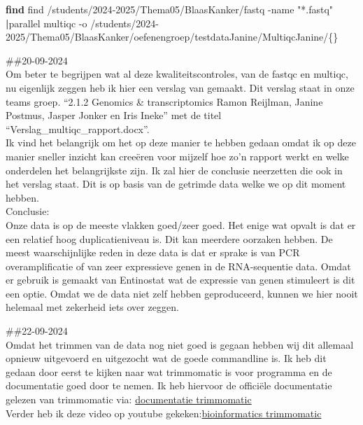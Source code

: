 \documentclass[
]{article}
\newenvironment{Shaded}{\begin{snugshade}}{\end{snugshade}}
\newcommand{\AttributeTok}[1]{\textcolor[rgb]{0.13,0.29,0.53}{#1}}
\newcommand{\ExtensionTok}[1]{#1}
\newcommand{\FunctionTok}[1]{\textcolor[rgb]{0.13,0.29,0.53}{\textbf{#1}}}
\newcommand{\KeywordTok}[1]{\textcolor[rgb]{0.13,0.29,0.53}{\textbf{#1}}}
\newcommand{\NormalTok}[1]{#1}
\newcommand{\StringTok}[1]{\textcolor[rgb]{0.31,0.60,0.02}{#1}}
\begin{document}
\begin{Shaded}
\begin{Highlighting}[]
\FunctionTok{find}\NormalTok{ find /students/2024{-}2025/Thema05/BlaasKanker/fastq }\AttributeTok{{-}name} \StringTok{"*.fastq"} \KeywordTok{|}\ExtensionTok{parallel}\NormalTok{ multiqc }\AttributeTok{{-}o}\NormalTok{ /students/2024{-}2025/Thema05/BlaasKanker/oefenengroep/testdataJanine/MultiqcJanine/\{\}}
\end{Highlighting}
\end{Shaded}

\#\#20-09-2024\\
Om beter te begrijpen wat al deze kwaliteitscontroles, van de fastqc en
multiqc, nu eigenlijk zeggen heb ik hier een verslag van gemaakt. Dit
verslag staat in onze teams groep. ``2.1.2 Genomics \& transcriptomics
Ramon Reijlman, Janine Postmus, Jasper Jonker en Iris Ineke'' met de
titel ``Verslag\_multiqc\_rapport.docx''.\\

Ik vind het belangrijk om het op deze manier te hebben gedaan omdat ik
op deze manier sneller inzicht kan creeëren voor mijzelf hoe zo'n
rapport werkt en welke onderdelen het belangrijkste zijn. Ik zal hier de
conclusie neerzetten die ook in het verslag staat. Dit is op basis van
de getrimde data welke we op dit moment hebben.\\

Conclusie:\\
Onze data is op de meeste vlakken goed/zeer goed. Het enige wat opvalt
is dat er een relatief hoog duplicatieniveau is. Dit kan meerdere
oorzaken hebben. De meest waarschijnlijke reden in deze data is dat er
sprake is van PCR overamplificatie of van zeer expressieve genen in de
RNA-sequentie data. Omdat er gebruik is gemaakt van Entinostat wat de
expressie van genen stimuleert is dit een optie. Omdat we de data niet
zelf hebben geproduceerd, kunnen we hier nooit helemaal met zekerheid
iets over zeggen.

\#\#22-09-2024\\
Omdat het trimmen van de data nog niet goed is gegaan hebben wij dit
allemaal opnieuw uitgevoerd en uitgezocht wat de goede commandline is.
Ik heb dit gedaan door eerst te kijken naar wat trimmomatic is voor
programma en de documentatie goed door te nemen. Ik heb hiervoor de
officiële documentatie gelezen van trimmomatic via:
\href{http://www.usadellab.org/cms/uploads/supplementary/Trimmomatic/TrimmomaticManual_V0.32.pdf}{documentatie
trimmomatic}\\
Verder heb ik deze video op youtube
gekeken:\href{https://www.youtube.com/watch?v=Op3W5TEej3k}{bioinformatics
trimmomatic}\\
\end{document}
